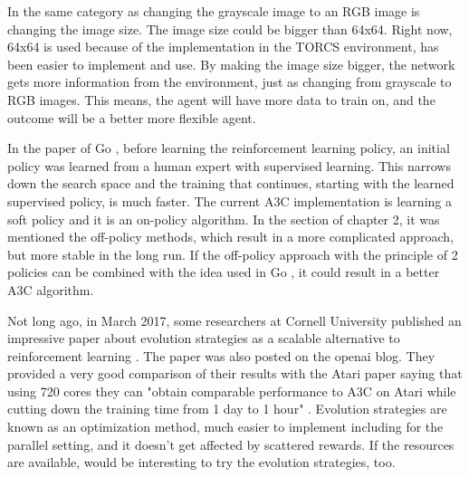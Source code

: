 In the same category as changing the grayscale image to an RGB image is changing the image size. The image size could be bigger than 64x64. Right now, 64x64 is used because of the implementation in the TORCS environment, has been easier to implement and use. By making the image size bigger, the network gets more information from the environment, just as changing from grayscale to RGB images. This means, the agent will have more data to train on, and the outcome will be a better more flexible agent.

In the paper of Go \cite{Silver_2016}, before learning the reinforcement learning policy, an initial policy was learned from a human expert with supervised learning. This narrows down the search space and the training that continues, starting with the learned supervised policy, is much faster. The current A3C implementation is learning a soft policy and it is an on-policy algorithm. In the  section of chapter 2, it was mentioned the off-policy methods, which result in a more complicated approach, but more stable in the long run. If the off-policy approach with the principle of 2 policies can be combined with the idea used in Go \cite{Silver_2016}, it could result in a better A3C algorithm.

Not long ago, in March 2017, some researchers at Cornell University published an impressive paper about evolution strategies as a scalable alternative to reinforcement learning \cite{EvolStrat}. The paper was also posted on the openai blog. They provided a very good comparison of their results with the Atari paper \cite{DBLP:journals/corr/MnihKSGAWR13} saying that using 720 cores they can "obtain comparable performance to A3C on Atari while cutting down the training time from 1 day to 1 hour" \cite{EvolStrat}. Evolution strategies are known as an optimization method, much easier to implement including for the parallel setting, and it doesn't get affected by scattered rewards. If the resources are available, would be interesting to try the evolution strategies, too.
